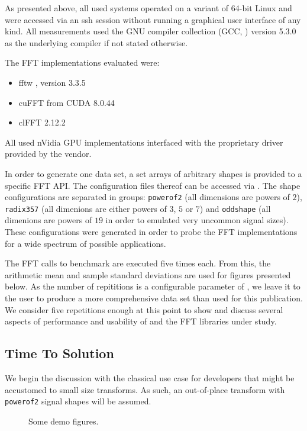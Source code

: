 As presented above, all used systems operated on a variant of 64-bit Linux and were accessed via an ssh session without running a graphical user interface of any kind. All measurements used the GNU compiler collection (GCC, \cite{stallman2001using}) version 5.3.0 as the underlying compiler if not stated otherwise. 

The FFT implementations evaluated were:

\begin{itemize}
\item fftw \cite{FFTW05}, version 3.3.5
\item cuFFT from CUDA 8.0.44
\item clFFT 2.12.2
\end{itemize}

All used nVidia GPU implementations interfaced with the proprietary driver provided by the vendor. 

In order to generate one data set, a set arrays of arbitrary shapes is provided to a specific FFT API. The configuration files thereof can be accessed via \cite{gearshifft_github}. The shape configurations are separated in groups: \texttt{powerof2} (all dimensions are powers of $2$), \texttt{radix357} (all dimenions are either powers of $3$, $5$ or $7$) and \texttt{oddshape} (all dimenions are powers of $19$ in order to emulated very uncommon signal sizes). These configurations were generated in order to probe the FFT implementations for a wide spectrum of possible applications.  

The FFT calls to benchmark are executed five times each. From this, the arithmetic mean and sample standard deviations are used for figures presented below. As the number of repititions is a configurable parameter of \gearshifft{}, we leave it to the user to produce a more comprehensive data set than used for this publication. We consider five repetitions enough at this point to show and discuss several aspects of performance and usability of \gearshifft{} and the FFT libraries under study.  


\subsection{Time To Solution}
\label{ssec:tts}

We begin the discussion with the classical use case for developers that might be accustomed to small size transforms. As such, an out-of-place transform with \texttt{powerof2} signal shapes will be assumed.  

\begin{figure}[!tbp]
  \centering
  \def\svgwidth{0.4\columnwidth}
  \subfloat[Fig A.]{\label{fig:f1}}
  \hfill
  \def\svgwidth{0.4\columnwidth}
  \subfloat[Fig B.]{\label{fig:f2}}
  \caption{Some demo figures.}
\end{figure}



